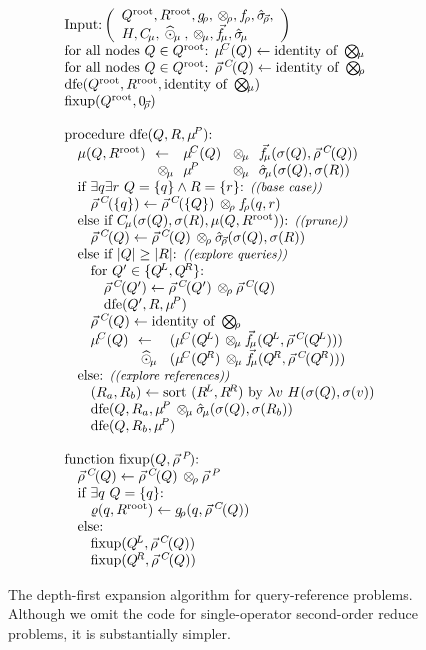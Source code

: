 \documentclass[times, leqno,twocolumn]{article}
\newcommand{\com}[1]{{\small \textit{((#1))}}}
\newcommand{\summary}{\hat{\sigma}}
\newcommand{\psty}{}
\newcommand{\X}{\\ \psty}
\newcommand{\x}{\X \hspace{0.13in}}
\newcommand{\xx}{\X \hspace{0.26in}}
\newcommand{\xxx}{\X \hspace{0.39in}}
\newcommand{\kdroot}[1]{#1^{\text{root}}}
\newcommand{\kdleft}[1]{#1^{\!L}}
\newcommand{\kdright}[1]{#1^{\!R}}
\newcommand{\nameOp}[2]{\mathop{#1\nolimits\!\!_{#2}}}
\newcommand{\nameop}[2]{{\scriptstyle\:}#1_{\!#2}}
\newcommand{\myOp}[1]{\nameOp{\bigotimes}{#1}}
\newcommand{\myop}[1]{\nameop{\otimes}{#1}}
\newcommand{\letterqr}{\rho}
\newcommand{\outqr}{\varrho}
\newcommand{\Opqr}{\myOp{\letterqr}}
\newcommand{\opqr}{\myop{\letterqr}}
\newcommand{\fqr}{f_{\!\letterqr}}
\newcommand{\gqr}{g_{\!\letterqr}}
\newcommand{\letterqrv}{\vec{\rho}}
\newcommand{\deltaqrv}{\summary_{\!\letterqrv}}
\newcommand{\identqr}{0_{\!\letterqrv}}
\newcommand{\varqrv}{\letterqrv^{\:C\!}}
\newcommand{\varqrvparent}{\letterqrv^{\:P\!}}
\newcommand{\lettermu}{\mu}
\newcommand{\inmu}{\mu}
\newcommand{\outopmu}{\:\widehat{\odot}_{\!\mu}\:}
\newcommand{\Opmu}{\myOp{\lettermu}}
\newcommand{\opmu}{\myop{\lettermu}}
\newcommand{\fmuv}{\vec{f_{\!\lettermu}}}
\newcommand{\deltamu}{\summary_{\!\lettermu}}
\newcommand{\canprunemu}{C_{\!\lettermu}}
\newcommand{\heurqr}{H}
\newcommand{\varmuchild}{\lettermu^{\!C}}
\newcommand{\varmuparent}{\lettermu^{\!P}}
\newcommand{\outstat}{\sigma}
\begin{document}
\begin{figure}
\[
  \begin{array}[t]{l}
    \\ \text{Input:}\left(
        \begin{array}[c]{l}\kdroot{Q}, \kdroot{R}, \gqr, \opqr, \fqr, \deltaqrv, \\ \heurqr, \canprunemu, \outopmu, \opmu, \fmuv, \deltamu\end{array}\right)
    \X \text{for all nodes } Q \in \kdroot{Q}\text{: } \varmuchild(Q) \gets \text{identity of }\Opmu
    \X \text{for all nodes } Q \in \kdroot{Q}\text{: } \varqrv(Q) \gets \text{identity of }\Opqr%
    \X \text{dfe}(\kdroot{Q}, \kdroot{R}, \text{identity of }\Opmu)
    \X \text{fixup}(\kdroot{Q}, \identqr)
    \X
    \X \text{procedure dfe}(Q, R, \varmuparent)\text{:}
    \x \!\!\!\begin{array}{lllll}
         \psty\inmu(Q,\kdroot{R}) &\psty\!\!\gets\!\!& \psty\varmuchild(Q) &\psty\!\!\opmu\!\!& \psty\fmuv(\outstat(Q), \varqrv(Q))
         \\              &\psty\!\!\opmu\!\!& \psty\varmuparent   &\psty\!\!\opmu\!\!& \psty\deltamu(\outstat(Q), \outstat(R))
       \end{array}
    \x \text{if } \exists q \exists r ~ Q = \{q\} \wedge R = \{r\}\text{: \com{base case}}
    \xx \varqrv(\{q\}) \gets \varqrv(\{Q\}) \opqr \fqr(q, r)
    \x \text{else if } \canprunemu(\outstat(Q), \outstat(R), \inmu(Q,\kdroot{R}))\text{: \com{prune}}
    \xx \varqrv(Q) \gets \varqrv(Q) \opqr \deltaqrv(\outstat(Q), \outstat(R))
    \x \text{else if } |Q| \geq |R|\text{: \com{explore queries}}
    \xx \text{for } Q' \in \{\kdleft{Q}, \kdright{Q}\}\text{:}
    \xxx \varqrv(Q') \gets \varqrv(Q') \opqr \varqrv(Q)
    \xxx \text{dfe}(Q', R, \varmuparent)
    \xx \varqrv(Q) \gets \text{identity of }\Opqr
    \xx \!\!\!\begin{array}{lll}
         \psty \varmuchild(Q) &\psty\!\!\gets\!\!&\psty (\varmuchild(\kdleft{Q})  \opmu \fmuv(\kdleft{Q}, \varqrv(\kdleft{Q})))
         \\          &\psty\!\!\outopmu\!\!&\psty (\varmuchild(\kdright{Q}) \opmu \fmuv(\kdright{Q}, \varqrv(\kdright{Q})))
        \end{array}
    \x \text{else: \com{explore references}}
    \xx (R_a, R_b) \gets \text{sort }(\kdleft{R}, \kdright{R})\text{ by }\lambda v ~ \heurqr(\sigma(Q), \sigma(v))
    \xx \text{dfe}(Q, R_a, \varmuparent \opmu \deltamu(\outstat(Q), \outstat(R_b))
    \xx \text{dfe}(Q, R_b, \varmuparent)
    \X
    \X \text{function fixup}(Q, \varqrvparent)\text{:}
    \x \varqrv(Q) \gets \varqrv(Q) \opqr \varqrvparent
    \x \text{if } \exists q ~ Q = \{q\}\text{:}
    \xx \outqr(q, \kdroot{R}) \gets \gqr(q, \varqrv(Q))
    \x \text{else:}
    \xx \text{fixup}(\kdleft{Q}, \varqrv(Q))
    \xx \text{fixup}(\kdright{Q}, \varqrv(Q))
  \end{array}
\]
\caption{\label{fig:dfe} The depth-first expansion algorithm for query-reference problems.
Although we omit the code for single-operator second-order reduce problems, it is substantially simpler.}
\end{figure}
\end{document}
